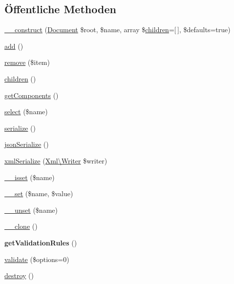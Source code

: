 \subsection*{Öffentliche Methoden}
\begin{DoxyCompactItemize}
\item 
\mbox{\hyperlink{class_sabre_1_1_v_object_1_1_component_a5db96c0140059e3d524db44fe3c56181}{\+\_\+\+\_\+construct}} (\mbox{\hyperlink{class_sabre_1_1_v_object_1_1_document}{Document}} \$root, \$name, array \$\mbox{\hyperlink{class_sabre_1_1_v_object_1_1_component_a93c24cb817d101bf72ff065f64f8f2fd}{children}}=\mbox{[}$\,$\mbox{]}, \$defaults=true)
\item 
\mbox{\hyperlink{class_sabre_1_1_v_object_1_1_component_a9e36d040e981cf1b073553611b2db4d2}{add}} ()
\item 
\mbox{\hyperlink{class_sabre_1_1_v_object_1_1_component_ac844b1ce72cf40be7e10b69e0f50d055}{remove}} (\$item)
\item 
\mbox{\hyperlink{class_sabre_1_1_v_object_1_1_component_a93c24cb817d101bf72ff065f64f8f2fd}{children}} ()
\item 
\mbox{\hyperlink{class_sabre_1_1_v_object_1_1_component_aaae7ae26cf94feae68a27a6fdab6cdc9}{get\+Components}} ()
\item 
\mbox{\hyperlink{class_sabre_1_1_v_object_1_1_component_afc4ec11d63f46fbf72cbc2c6013efd93}{select}} (\$name)
\item 
\mbox{\hyperlink{class_sabre_1_1_v_object_1_1_component_a14bee8fa50a8c5bbdf076706f706484f}{serialize}} ()
\item 
\mbox{\hyperlink{class_sabre_1_1_v_object_1_1_component_a26e668c96dbe42b7c9fa49e91cc463b0}{json\+Serialize}} ()
\item 
\mbox{\hyperlink{class_sabre_1_1_v_object_1_1_component_a9676c9903a859d01ea2edd016e3ffd02}{xml\+Serialize}} (\mbox{\hyperlink{class_sabre_1_1_xml_1_1_writer}{Xml\textbackslash{}\+Writer}} \$writer)
\item 
\mbox{\hyperlink{class_sabre_1_1_v_object_1_1_component_af87d2d3150a11e3717b468eca24705d0}{\+\_\+\+\_\+isset}} (\$name)
\item 
\mbox{\hyperlink{class_sabre_1_1_v_object_1_1_component_aaa4f659daf7c8f0b7b2883417313af5d}{\+\_\+\+\_\+set}} (\$name, \$value)
\item 
\mbox{\hyperlink{class_sabre_1_1_v_object_1_1_component_af3ef2628c178c2ccc0e10396931c8046}{\+\_\+\+\_\+unset}} (\$name)
\item 
\mbox{\hyperlink{class_sabre_1_1_v_object_1_1_component_a366cf17ec7cac427403be1a0a8a2e6d7}{\+\_\+\+\_\+clone}} ()
\item 
\mbox{\label{class_sabre_1_1_v_object_1_1_component_a0c14763d047d7bff44f12264ddfec856}} 
{\bfseries get\+Validation\+Rules} ()
\item 
\mbox{\hyperlink{class_sabre_1_1_v_object_1_1_component_aa21e8c8130234fa60af0165c27502467}{validate}} (\$options=0)
\item 
\mbox{\hyperlink{class_sabre_1_1_v_object_1_1_component_ac086b0ad6f867f4ae03abf2919f9a131}{destroy}} ()
\end{DoxyCompactItemize}
